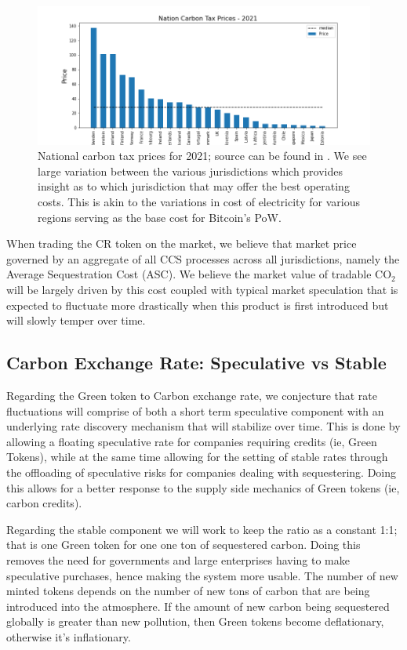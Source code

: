 \documentclass{article}
\begin{document}
\begin{figure}[h]
\centering
\includegraphics[width=5in]{nation_carbon_taxes.png}
\caption{National carbon tax prices for 2021; source can be found in \cite{WBank}. We see large variation between the various jurisdictions which provides insight as to which jurisdiction that may offer the best operating costs. This is akin to the variations in cost of electricity for various regions serving as the base cost for Bitcoin's PoW.} 
\label{figure:nation_carbon_taxes}
\end{figure} 

When trading the CR token on the market, we believe that market price governed by an aggregate of all CCS processes across all jurisdictions, namely the Average Sequestration Cost (ASC). We believe the market value of tradable CO$_{2}$ will be largely driven by this cost coupled with typical market speculation that is expected to fluctuate more drastically when this product is first introduced but will slowly temper over time.

\subsection{Carbon Exchange Rate: Speculative vs Stable}

Regarding the Green token to Carbon exchange rate, we conjecture that rate fluctuations will comprise of both a short term speculative component with an underlying rate discovery mechanism that will stabilize over time. This is done by allowing a floating speculative rate for companies requiring credits (ie, Green Tokens), while at the same time allowing for the setting of stable rates through the offloading of speculative risks for companies dealing with sequestering. Doing this allows for a better response to the supply side mechanics of Green tokens (ie, carbon credits).

Regarding the stable component we will work to keep the ratio as a constant 1:1; that is one Green token for one one ton of sequestered carbon. Doing this removes the need for governments and large enterprises having to make speculative purchases, hence making the system more usable. The number of new minted tokens depends on the number of new tons of carbon that are being introduced into the atmosphere. If the amount of new carbon being sequestered globally is greater than new pollution, then Green tokens become deflationary, otherwise it's inflationary.
\end{document}
